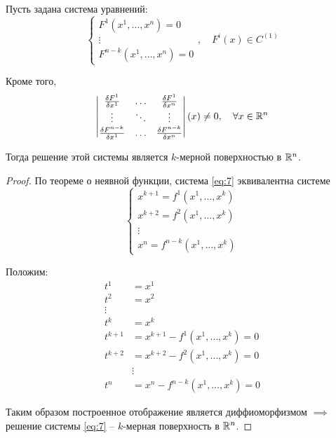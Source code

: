 \begin{statement}
    Пусть задана система уравнений:
    \begin{equation}\label{eq:7}
        \left\{\begin{array}{l}
            F^1(x^1,\ldots,x^n) = 0 \\
            \vdots                  \\
            F^{n-k}(x^1,\ldots,x^n) = 0
        \end{array}\right.,\quad F^i(x)\in C^{(1)}
    \end{equation}

    Кроме того,
    \[
        \left|\begin{matrix}
            \frac{\delta F^1}{\delta x^1}     & \ldots & \frac{\delta F^1}{\delta x^n}     \\
            \vdots                            & \ddots & \vdots                            \\
            \frac{\delta F^{n-k}}{\delta x^1} & \ldots & \frac{\delta F^{n-k}}{\delta x^n}
        \end{matrix}\right|(x) \ne 0, \quad \forall x \in \mathbb{R}^n
    \]

    Тогда решение этой системы является $k$-мерной поверхностью в $\mathbb{R}^n$.
\end{statement}

\begin{proof}
    По теореме о неявной функции, система \ref{eq:7} эквивалентна системе
    \[
        \left\{\begin{array}{l}
            x^{k+1} = f^1(x^1,\ldots,x^k) \\
            x^{k+2} = f^2(x^1,\ldots,x^k) \\
            \vdots                        \\
            x^n = f^{n-k}(x^1,\ldots,x^k)
        \end{array}\right.
    \]

    Положим:
    \begin{align*}
        t^1     & = x^1                               \\
        t^2     & = x^2                               \\
        \vdots                                        \\
        t^k     & = x^k                               \\
        t^{k+1} & = x^{k+1} - f^1(x^1,\ldots,x^k) = 0 \\
        t^{k+2} & = x^{k+2} - f^2(x^1,\ldots,x^k) = 0 \\
                & \vdots                              \\
        t^{n}   & = x^n - f^{n-k}(x^1,\ldots,x^k) = 0
    \end{align*}

    Таким образом построенное отображение является диффиоморфизмом $\implies$ решение системы \ref{eq:7} -- $k$-мерная поверхность в $\mathbb{R}^n$.
\end{proof}

